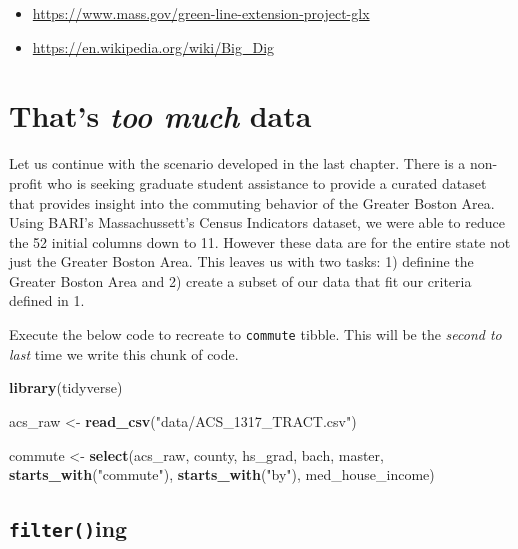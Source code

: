 \documentclass[
]{book}
\newenvironment{Shaded}{\begin{snugshade}}{\end{snugshade}}
\newcommand{\KeywordTok}[1]{\textcolor[rgb]{0.13,0.29,0.53}{\textbf{#1}}}
\newcommand{\NormalTok}[1]{#1}
\newcommand{\StringTok}[1]{\textcolor[rgb]{0.31,0.60,0.02}{#1}}
\providecommand{\tightlist}{%
  \setlength{\itemsep}{0pt}\setlength{\parskip}{0pt}}
\begin{document}
\begin{itemize}
\tightlist
\item
  \url{https://www.mass.gov/green-line-extension-project-glx}
\item
  \url{https://en.wikipedia.org/wiki/Big_Dig}
\end{itemize}

\hypertarget{thats-too-much-data}{%
\chapter{\texorpdfstring{That's \emph{too much} data}{That's too much data}}\label{thats-too-much-data}}

Let us continue with the scenario developed in the last chapter. There is a non-profit who is seeking graduate student assistance to provide a curated dataset that provides insight into the commuting behavior of the Greater Boston Area. Using BARI's Massachussett's Census Indicators dataset, we were able to reduce the 52 initial columns down to 11. However these data are for the entire state not just the Greater Boston Area. This leaves us with two tasks: 1) definine the Greater Boston Area and 2) create a subset of our data that fit our criteria defined in 1.

Execute the below code to recreate to \texttt{commute} tibble. This will be the \emph{second to last} time we write this chunk of code.

\begin{Shaded}
\begin{Highlighting}[]
\KeywordTok{library}\NormalTok{(tidyverse)}

\NormalTok{acs\_raw \textless{}{-}}\StringTok{ }\KeywordTok{read\_csv}\NormalTok{(}\StringTok{"data/ACS\_1317\_TRACT.csv"}\NormalTok{)}

\NormalTok{commute \textless{}{-}}\StringTok{ }\KeywordTok{select}\NormalTok{(acs\_raw,}
\NormalTok{                  county,}
\NormalTok{                  hs\_grad, bach, master,}
                  \KeywordTok{starts\_with}\NormalTok{(}\StringTok{"commute"}\NormalTok{),}
                  \KeywordTok{starts\_with}\NormalTok{(}\StringTok{"by"}\NormalTok{),}
\NormalTok{                  med\_house\_income)}
\end{Highlighting}
\end{Shaded}

\hypertarget{filtering}{%
\section{\texorpdfstring{\texttt{filter()}ing}{filter()ing}}\label{filtering}}
\end{document}
